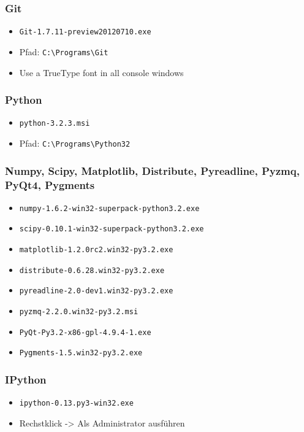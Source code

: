 \subsubsection{Git}
\begin{itemize}
  \item \texttt{Git-1.7.11-preview20120710.exe}
  \item Pfad: \verb|C:\Programs\Git|
  \item Use a TrueType font in all console windows
\end{itemize}

\subsubsection{Python}
\begin{itemize}
  \item \texttt{python-3.2.3.msi}
  \item Pfad: \verb|C:\Programs\Python32|
\end{itemize}

\subsubsection{Numpy, Scipy, Matplotlib, Distribute, Pyreadline, Pyzmq, PyQt4, Pygments}
\begin{itemize}
  \item \texttt{numpy-1.6.2-win32-superpack-python3.2.exe}
  \item \texttt{scipy-0.10.1-win32-superpack-python3.2.exe}
  \item \texttt{matplotlib-1.2.0rc2.win32-py3.2.exe}
  \item \texttt{distribute-0.6.28.win32-py3.2.exe}
  \item \texttt{pyreadline-2.0-dev1.win32-py3.2.exe}
  \item \texttt{pyzmq-2.2.0.win32-py3.2.msi}
  \item \texttt{PyQt-Py3.2-x86-gpl-4.9.4-1.exe}
  \item \texttt{Pygments-1.5.win32-py3.2.exe}
\end{itemize}

\subsubsection{IPython}
\begin{itemize}
  \item \texttt{ipython-0.13.py3-win32.exe}
  \item Rechstklick -> Als Administrator ausführen
\end{itemize}

